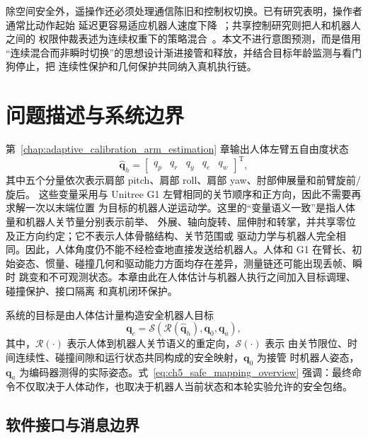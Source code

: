 除空间安全外，遥操作还必须处理通信陈旧和控制权切换。已有研究表明，操作者通常比动作起始
延迟更容易适应机器人速度下降~\cite{rakita2020effects}；共享控制研究则把人和机器人之间的
权限仲裁表述为连续权重下的策略混合~\cite{dragan2013policy}。本文不进行意图预测，而是借用
“连续混合而非瞬时切换”的思想设计渐进接管和释放，并结合目标年龄监测与看门狗停止，把
连续性保护和几何保护共同纳入真机执行链。

\section{问题描述与系统边界}
\label{sec:ch5_problem_scope}

第~\ref{chap:adaptive_calibration_arm_estimation} 章输出人体左臂五自由度状态
\begin{equation}
  \hat{\boldsymbol q}_h=
  \begin{bmatrix}
    q_p&q_r&q_y&q_e&q_w
  \end{bmatrix}^{\mathrm T},
  \label{eq:ch5_human_state}
\end{equation}
其中五个分量依次表示肩部 pitch、肩部 roll、肩部 yaw、肘部伸展量和前臂旋前/旋后。
这些变量采用与 Unitree G1 左臂相同的关节顺序和正方向，因此不需要再求解一次以末端位置
为目标的机器人逆运动学。这里的“变量语义一致”是指人体量和机器人关节量分别表示前举、
外展、轴向旋转、屈伸肘和转掌，并共享零位及正方向约定；它不表示人体骨骼结构、关节范围或
驱动力学与机器人完全相同。因此，人体角度仍不能不经检查地直接发送给机器人。人体和 G1
在臂长、初始姿态、惯量、碰撞几何和驱动能力方面均存在差异，测量链还可能出现丢帧、瞬时
跳变和不可观测状态。本章由此在人体估计与机器人执行之间加入目标调理、碰撞保护、接口隔离
和真机闭环保护。

系统的目标是由人体估计量构造安全机器人目标
\begin{equation}
  \boldsymbol q_c =
  \mathcal S\!\left(\mathcal R(\hat{\boldsymbol q}_h),
  \boldsymbol q_0,\boldsymbol q_a\right),
  \label{eq:ch5_safe_mapping_overview}
\end{equation}
其中，$\mathcal R(\cdot)$ 表示人体到机器人关节语义的重定向，$\mathcal S(\cdot)$ 表示
由关节限位、时间连续性、碰撞间隙和运行状态共同构成的安全映射，$\boldsymbol q_0$ 为接管
时机器人姿态，$\boldsymbol q_a$ 为编码器测得的实际姿态。式~\eqref{eq:ch5_safe_mapping_overview}
强调：最终命令不仅取决于人体动作，也取决于机器人当前状态和本轮实验允许的安全包络。

\subsection{软件接口与消息边界}
\label{subsec:ch5_interfaces_messages}

